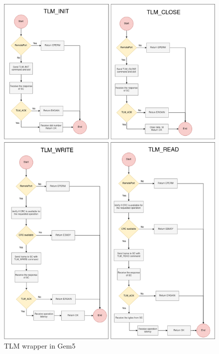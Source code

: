 \begin{figure}[H]
	\centering
 	\includegraphics[width=0.8\linewidth]{Images/TLMWrapper_Gem5.png} 
 	\caption{TLM wrapper in Gem5}
\end{figure}

